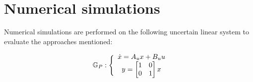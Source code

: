 \documentclass[letterpaper, 10 pt, conference]{ieeeconf}  %
\begin{document}
\section{Numerical simulations}
Numerical simulations are performed on the following uncertain linear system to evaluate the approaches mentioned:

\begin{equation}
\begin{matrix}
\mathbb{G}_P : \Bigg\{ & \hspace{-5pt}
\begin{matrix}
\dot{x} = A_ux+B_uu \\
y = \begin{bmatrix} 1 & 0 \\ 0 & 1 \end{bmatrix} x 
\end{matrix}
\end{matrix}
\end{equation}
\end{document}
